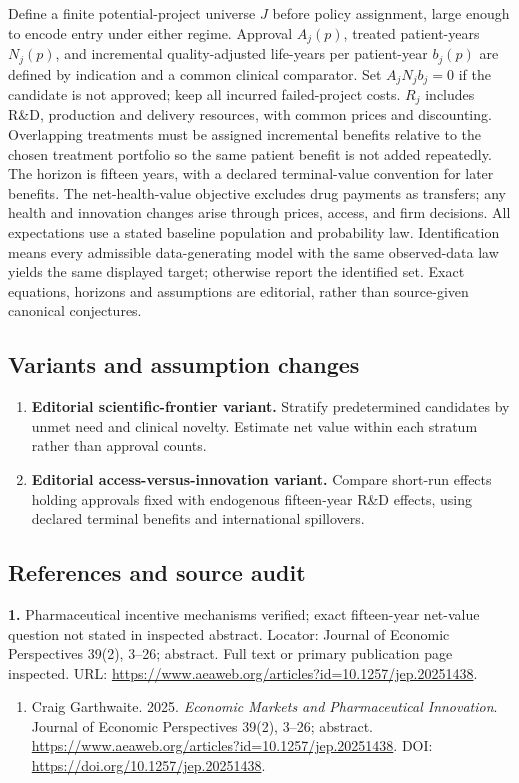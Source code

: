 \documentclass[11pt,a4paper]{article}
\begin{document}
Define a finite potential-project universe \(J\) before policy assignment, large enough to encode entry under either regime. Approval \(A_j(p)\), treated patient-years \(N_j(p)\), and incremental quality-adjusted life-years per patient-year \(b_j(p)\) are defined by indication and a common clinical comparator. Set \(A_jN_jb_j=0\) if the candidate is not approved; keep all incurred failed-project costs. \(R_j\) includes R\&D, production and delivery resources, with common prices and discounting. Overlapping treatments must be assigned incremental benefits relative to the chosen treatment portfolio so the same patient benefit is not added repeatedly. The horizon is fifteen years, with a declared terminal-value convention for later benefits. The net-health-value objective excludes drug payments as transfers; any health and innovation changes arise through prices, access, and firm decisions. All expectations use a stated baseline population and probability law. Identification means every admissible data-generating model with the same observed-data law yields the same displayed target; otherwise report the identified set. Exact equations, horizons and assumptions are editorial, rather than source-given canonical conjectures.
\subsection*{Variants and assumption changes}
\begin{enumerate}
\item \textbf{Editorial scientific-frontier variant.} Stratify predetermined candidates by unmet need and clinical novelty. Estimate net value within each stratum rather than approval counts.
\item \textbf{Editorial access-versus-innovation variant.} Compare short-run effects holding approvals fixed with endogenous fifteen-year R\&D effects, using declared terminal benefits and international spillovers.
\end{enumerate}
\subsection*{References and source audit}
\textbf{1.} Pharmaceutical incentive mechanisms verified; exact fifteen-year net-value question not stated in inspected abstract. Locator: Journal of Economic Perspectives 39(2), 3–26; abstract. Full text or primary publication page inspected. URL: \url{https://www.aeaweb.org/articles?id=10.1257/jep.20251438}.
\begin{enumerate}\raggedright
\item\hypertarget{definitions:source:30007727:1}{} Craig Garthwaite. 2025. \emph{Economic Markets and Pharmaceutical Innovation}. Journal of Economic Perspectives 39(2), 3–26; abstract.
\url{https://www.aeaweb.org/articles?id=10.1257/jep.20251438}.
DOI: \url{https://doi.org/10.1257/jep.20251438}.
\end{enumerate}
\end{document}
